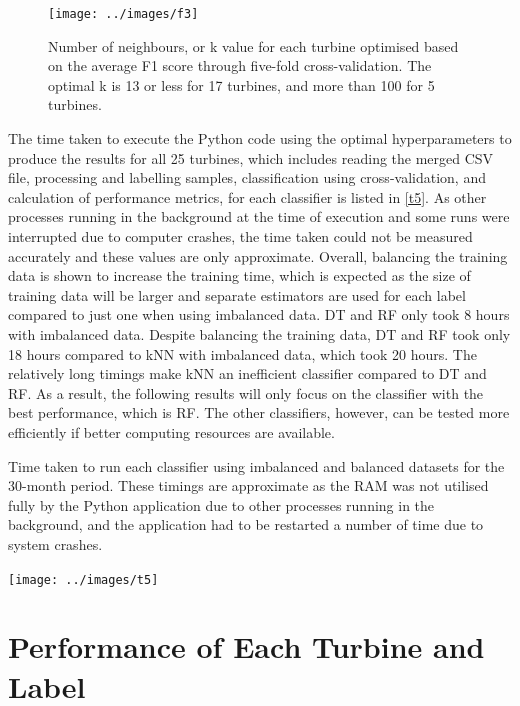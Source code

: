 \begin{figure}
  \centering
  \texttt{[image: ../images/f3]}
  \caption{\label{f3}Number of neighbours, or k value for each turbine
  optimised based on the average F1 score through five-fold cross-validation.
  The optimal k is 13 or less for 17 turbines, and more than 100 for 5
  turbines.}
\end{figure}

The time taken to execute the Python code using the optimal hyperparameters to
produce the results for all 25 turbines, which includes reading the merged CSV
file, processing and labelling samples, classification using cross-validation,
and calculation of performance metrics, for each classifier is listed in
\autoref{t5}. As other processes running in the background at the time of
execution and some runs were interrupted due to computer crashes, the time
taken could not be measured accurately and these values are only approximate.
Overall, balancing the training data is shown to increase the training time,
which is expected as the size of training data will be larger and separate
estimators are used for each label compared to just one when using imbalanced
data. DT and RF only took 8 hours with imbalanced data. Despite balancing the
training data, DT and RF took only 18 hours compared to kNN with imbalanced
data, which took 20 hours. The relatively long timings make kNN an inefficient
classifier compared to DT and RF. As a result, the following results will only
focus on the classifier with the best performance, which is RF. The other
classifiers, however, can be tested more efficiently if better computing
resources are available.

\begin{table}
  \centering
  \caption{\label{t5}Time taken to run each classifier using imbalanced and
  balanced datasets for the 30-month period. These timings are approximate as
  the RAM was not utilised fully by the Python application due to other
  processes running in the background, and the application had to be restarted
  a number of time due to system crashes.}
  \texttt{[image: ../images/t5]}
\end{table}

\section{Performance of Each Turbine and Label}


